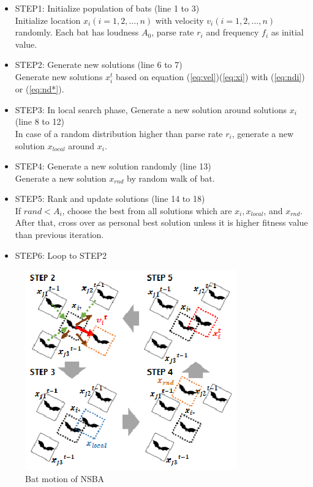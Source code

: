 \documentclass{ies2018}
\begin{document}
\begin{itemize}
\item STEP1: Initialize population of bats (line 1 to 3)\\
Initialize location ${x_i}(i=1, 2, ..., n)$ with velocity ${v_i}(i=1, 2, ..., n)$ randomly. Each bat has loudness ${A_0}$, parse rate ${r_i}$ and frequency ${f_i}$ as initial value.
\item STEP2: Generate new solutions (line 6 to 7)\\
Generate new solutions ${x_i^t}$ based on equation (\ref{eq:vel})(\ref{eq:xi}) with (\ref{eq:ndi}) or (\ref{eq:nd*}).
\item STEP3: In local search phase, Generate a new solution around solutions ${x_i}$ (line 8 to 12)\\
In case of a random distribution higher than parse rate ${r_i}$, generate a new solution ${x_{local}}$ around ${x_i}$.
\item STEP4: Generate a new solution randomly (line 13)\\
Generate a new solution ${x_{rnd}}$ by random walk of bat.  
\item STEP5: Rank and update solutions (line 14 to 18)\\
If ${rand < A_i}$, choose the best from all solutions which are ${x_i, x_{local}}$, and ${x_{rnd}}$. After that, cross over as personal best solution unless it is higher fitness value than previous iteration.  
\item STEP6: Loop to STEP2
\end{itemize}

\begin{figure}[h]
\begin{center}
\includegraphics[width=1.0\linewidth]{eps/sbat_motion.eps}
\end{center}
\caption{Bat motion of NSBA}
\label{fig:sbat}
\end{figure}
\end{document}
